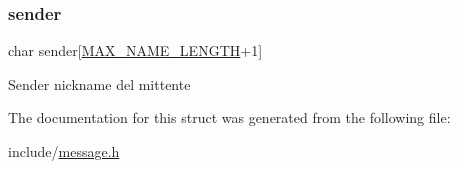 \subsubsection{\texorpdfstring{sender}{sender}}
{\footnotesize\ttfamily char sender\mbox{[}\hyperlink{config_8h_a0c397a708cec89c74029582574516b30}{M\+A\+X\+\_\+\+N\+A\+M\+E\+\_\+\+L\+E\+N\+G\+TH}+1\mbox{]}}

Sender nickname del mittente 

The documentation for this struct was generated from the following file\+:\begin{DoxyCompactItemize}
\item 
include/\hyperlink{message_8h}{message.\+h}\end{DoxyCompactItemize}

